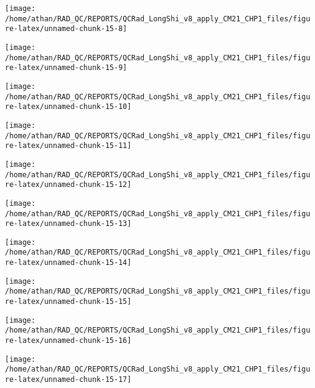 \documentclass[
  10pt,
  a4paper,oneside]{article}
\begin{document}
\begin{center}\texttt{[image: /home/athan/RAD\_QC/REPORTS/QCRad\_LongShi\_v8\_apply\_CM21\_CHP1\_files/figure-latex/unnamed-chunk-15-8]} \end{center}

\begin{center}\texttt{[image: /home/athan/RAD\_QC/REPORTS/QCRad\_LongShi\_v8\_apply\_CM21\_CHP1\_files/figure-latex/unnamed-chunk-15-9]} \end{center}

\begin{center}\texttt{[image: /home/athan/RAD\_QC/REPORTS/QCRad\_LongShi\_v8\_apply\_CM21\_CHP1\_files/figure-latex/unnamed-chunk-15-10]} \end{center}

\begin{center}\texttt{[image: /home/athan/RAD\_QC/REPORTS/QCRad\_LongShi\_v8\_apply\_CM21\_CHP1\_files/figure-latex/unnamed-chunk-15-11]} \end{center}

\begin{center}\texttt{[image: /home/athan/RAD\_QC/REPORTS/QCRad\_LongShi\_v8\_apply\_CM21\_CHP1\_files/figure-latex/unnamed-chunk-15-12]} \end{center}

\begin{center}\texttt{[image: /home/athan/RAD\_QC/REPORTS/QCRad\_LongShi\_v8\_apply\_CM21\_CHP1\_files/figure-latex/unnamed-chunk-15-13]} \end{center}

\begin{center}\texttt{[image: /home/athan/RAD\_QC/REPORTS/QCRad\_LongShi\_v8\_apply\_CM21\_CHP1\_files/figure-latex/unnamed-chunk-15-14]} \end{center}

\begin{center}\texttt{[image: /home/athan/RAD\_QC/REPORTS/QCRad\_LongShi\_v8\_apply\_CM21\_CHP1\_files/figure-latex/unnamed-chunk-15-15]} \end{center}

\begin{center}\texttt{[image: /home/athan/RAD\_QC/REPORTS/QCRad\_LongShi\_v8\_apply\_CM21\_CHP1\_files/figure-latex/unnamed-chunk-15-16]} \end{center}

\begin{center}\texttt{[image: /home/athan/RAD\_QC/REPORTS/QCRad\_LongShi\_v8\_apply\_CM21\_CHP1\_files/figure-latex/unnamed-chunk-15-17]} \end{center}
\end{document}

